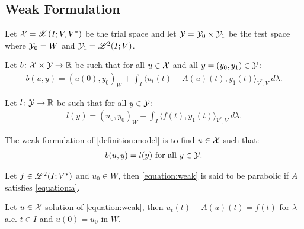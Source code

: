 \newpage
\subsection{Weak Formulation}

\begin{definition}
    Let $\mathcal{X} = \mathscr{X}(I; V, V^*)$ be the trial space and let $\mathcal{Y} = \mathcal{Y}_0 \times \mathcal{Y}_1$ be the test space where $\mathcal{Y}_0 = W$ and $\mathcal{Y}_1 = \mathscr{L}^{2}(I; V)$.
\end{definition}

\begin{definition}[$b$]
    Let $b \colon \mathcal{X} \times \mathcal{Y} \rightarrow \mathbb{R}$ be such that for all $u \in \mathcal{X}$ and all $y = (y_0, y_1) \in \mathcal{Y}$:
    \begin{gather}
        b(u, y) = \left( u(0), y_0 \right)_W + \int_I \langle u_t(t) + A(u)(t), y_1(t) \rangle_{V^*, V} ~ d \lambda.
    \end{gather}
\end{definition}

\begin{definition}[$l$]
    Let $l \colon \mathcal{Y} \rightarrow \mathbb{R}$ be such that for all $y \in \mathcal{Y}$:
    \begin{gather}
        l(y) = \left( u_0, y_0 \right)_W + \int_I \langle f(t), y_1(t) \rangle_{V^*, V} ~ d \lambda.
    \end{gather}
\end{definition}

\begin{definition}
    The weak formulation of \ref{definition:model} is to find $u \in \mathcal{X}$ such that:
    \begin{gather}
        b(u, y) = l(y) \text{ for all } y \in \mathcal{Y}. \label{equation:weak}
    \end{gather}
\end{definition}

\begin{definition}
    Let $f \in \mathscr{L}^{2}(I; V^*)$ and $u_0 \in W$, then \eqref{equation:weak} is said to be parabolic if $A$ satisfies \eqref{equation:a}.
\end{definition}

\begin{lemma}
    Let $u \in \mathcal{X}$ solution of \eqref{equation:weak}, then $u_t(t) + A(u)(t) = f(t)$ for $\lambda$-a.e. $t \in I$ and $u(0) = u_0$ in $W$.
\end{lemma}